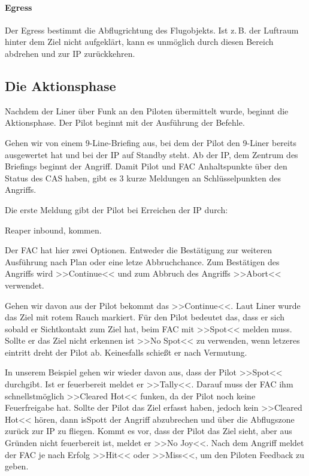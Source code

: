 \paragraph*{Egress}
	Der Egress bestimmt die Abflugrichtung des Flugobjekts. Ist z.\,B. der Luftraum hinter dem Ziel nicht aufgeklärt, kann es unmöglich durch diesen Bereich abdrehen und zur IP zurückkehren.

\subsection{Die Aktionsphase}
	Nachdem der Liner über Funk an den Piloten übermittelt wurde, beginnt die Aktionsphase. Der Pilot beginnt mit der Ausführung der Befehle.\par
	Gehen wir von einem 9-Line-Briefing aus, bei dem der Pilot den 9-Liner bereits ausgewertet hat und bei der IP auf Standby steht. Ab der IP, dem Zentrum des Briefings beginnt der Angriff. Damit Pilot und FAC Anhaltspunkte über den Status des CAS haben, gibt es 3 kurze Meldungen an Schlüsselpunkten des Angriffs.\par
	Die erste Meldung gibt der Pilot bei Erreichen der IP durch:
	\begin{hint}
	Reaper inbound, kommen.
	\end{hint}
	Der FAC hat hier zwei Optionen. Entweder die Bestätigung zur weiteren Ausführung nach Plan oder eine letze Abbruchchance. Zum Bestätigen des Angriffs wird >>Continue<< und zum Abbruch des Angriffs >>Abort<< verwendet.\par
	Gehen wir davon aus der Pilot bekommt das >>Continue<<. Laut Liner wurde das Ziel mit rotem Rauch markiert. Für den Pilot bedeutet das, dass er sich sobald er Sichtkontakt zum Ziel hat, beim FAC mit >>Spot<< melden muss. Sollte er das Ziel nicht erkennen ist >>No Spot<< zu verwenden, wenn letzeres eintritt dreht der Pilot ab. Keinesfalls schießt er nach Vermutung.\par
	In unserem Beispiel gehen wir wieder davon aus, dass der Pilot >>Spot<< durchgibt. Ist er feuerbereit meldet er >>Tally<<. Darauf muss der FAC ihm schnellstmöglich >>Cleared Hot<< funken, da der Pilot noch keine Feuerfreigabe hat. Sollte der Pilot das Ziel erfasst haben, jedoch kein >>Cleared Hot<< hören, dann isSpott der Angriff abzubrechen und über die Abflugszone zurück zur IP zu fliegen. Kommt es vor, dass der Pilot das Ziel sieht, aber aus Gründen nicht feuerbereit ist, meldet er >>No Joy<<. Nach dem Angriff meldet der FAC je nach Erfolg >>Hit<< oder >>Miss<<, um den Piloten Feedback zu geben.

